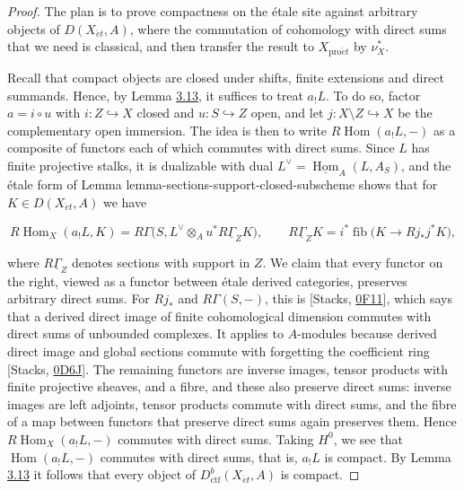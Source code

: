 \documentclass[11pt]{article}
\providecommand{\Hom}{}\renewcommand{\Hom}{\operatorname{Hom}}
\providecommand{\fib}{}\renewcommand{\fib}{\operatorname{fib}}
\begin{document}
\begin{proof}[{Proof}]\label{bp452}%
The plan is to prove compactness on the étale site against arbitrary objects of \(D(X_{\acute{e}t},A)\), where the commutation of cohomology with direct sums that we need is classical, and then transfer the result to \(X_{\mathrm{pro}\acute{e}t}\) by \(\nu_X^*\).

Recall that compact objects are closed under shifts, finite extensions and direct summands. Hence, by Lemma \hyperref[bp235]{3.13}, it suffices to treat \(a_!L\). To do so, factor \(a=i\circ u\) with \(i:Z\hookrightarrow X\) closed and \(u:S\hookrightarrow Z\) open, and let \(j:X\setminus Z\hookrightarrow X\) be the complementary open immersion. The idea is then to write \(R\!\operatorname{Hom}(a_!L,-)\) as a composite of functors each of which commutes with direct sums. Since \(L\) has finite projective stalks, it is dualizable with dual \(L^\vee=\underline{\operatorname{Hom}}_A(L,A_S)\), and the étale form of Lemma lemma-sections-support-closed-subscheme shows that for \(K\in D(X_{\acute{e}t},A)\) we have

\[
R\!\operatorname{Hom}_X(a_!L,K)
=R\Gamma\bigl(S,L^\vee\otimes_A u^*R\underline\Gamma_ZK\bigr),
\qquad R\underline\Gamma_ZK=i^*\fib\bigl(K\to Rj_*j^*K\bigr),
\]

where \(R\underline\Gamma_Z\) denotes sections with support in \(Z\). We claim that every functor on the right, viewed as a functor between étale derived categories, preserves arbitrary direct sums. For \(Rj_*\) and \(R\Gamma(S,-)\), this is [Stacks, \href{https://stacks.math.columbia.edu/tag/0F11}{0F11}], which says that a derived direct image of finite cohomological dimension commutes with direct sums of unbounded complexes. It applies to \(A\)-modules because derived direct image and global sections commute with forgetting the coefficient ring [Stacks, \href{https://stacks.math.columbia.edu/tag/0D6J}{0D6J}]. The remaining functors are inverse images, tensor products with finite projective sheaves, and a fibre, and these also preserve direct sums: inverse images are left adjoints, tensor products commute with direct sums, and the fibre of a map between functors that preserve direct sums again preserves them. Hence \(R\!\operatorname{Hom}_X(a_!L,-)\) commutes with direct sums. Taking \(H^0\), we see that \(\Hom(a_!L,-)\) commutes with direct sums, that is, \(a_!L\) is compact. By Lemma \hyperref[bp235]{3.13} it follows that every object of \(D^b_{\mathrm{ctf}}(X_{\acute{e}t},A)\) is compact.


\end{proof}
\end{document}
